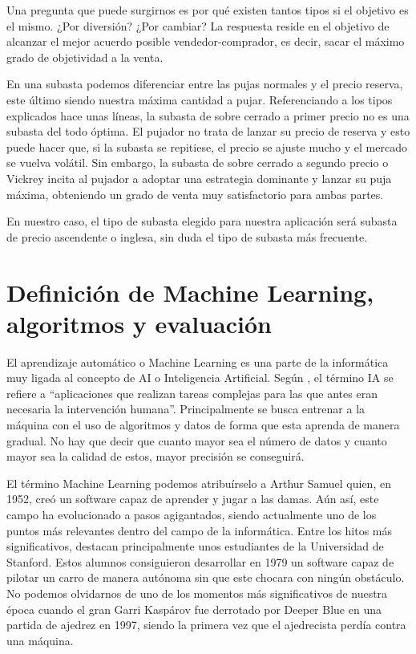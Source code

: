 	Una pregunta que puede surgirnos es por qué existen tantos tipos si el objetivo es el mismo. ¿Por diversión? ¿Por cambiar? La respuesta reside en el objetivo de alcanzar el mejor acuerdo posible vendedor-comprador, es decir, sacar el máximo grado de objetividad a la venta. 
	
	En una subasta podemos diferenciar entre las pujas normales y el precio reserva, este último siendo nuestra máxima cantidad a pujar. Referenciando a los tipos explicados hace unas líneas, la subasta de sobre cerrado a primer precio no es una subasta del todo óptima. El pujador no trata de lanzar su precio de reserva y esto puede hacer que, si la subasta se repitiese, el precio se ajuste mucho y el mercado se vuelva volátil. Sin embargo, la subasta de sobre cerrado a segundo precio o Vickrey incita al pujador a adoptar una estrategia dominante y lanzar su puja máxima, obteniendo un grado de venta muy satisfactorio para ambas partes.
	
	En nuestro caso, el tipo de subasta elegido para nuestra aplicación será subasta de precio ascendente o inglesa, sin duda el tipo de subasta más frecuente.
	
	

\section{Definición de Machine Learning, algoritmos y evaluación}

	El aprendizaje automático o Machine Learning es una parte de la informática muy ligada al concepto de AI o Inteligencia Artificial. Según \cite{oracle:homepage}, el término IA se refiere a ``aplicaciones que realizan tareas complejas para las que antes eran necesaria la intervención humana''. Principalmente se busca entrenar a la máquina con el uso de algoritmos y datos de forma que esta aprenda de manera gradual. No hay que decir que cuanto mayor sea el número de datos y cuanto mayor sea la calidad de estos, mayor precisión se conseguirá. 
	
	El término Machine Learning podemos atribuírselo a Arthur Samuel quien, en 1952, creó un software capaz de aprender y jugar a las damas. Aún así, este campo ha evolucionado a pasos agigantados, siendo actualmente uno de los puntos más relevantes dentro del campo de la informática. Entre los hitos más significativos, destacan principalmente unos estudiantes de la Universidad de Stanford. Estos alumnos consiguieron desarrollar en 1979 un software capaz de pilotar un carro de manera autónoma sin que este chocara con ningún obstáculo.  No podemos olvidarnos de uno de los momentos más significativos de nuestra época cuando el gran Garri Kaspárov fue derrotado por Deeper Blue en una partida de ajedrez en 1997, siendo la primera vez que el ajedrecista perdía contra una máquina.
	
